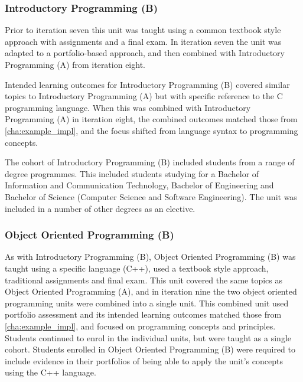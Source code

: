 
\subsubsection{Introductory Programming (B)} %
\label{ssub:introductory_programming_b}

Prior to iteration seven this unit was taught using a common textbook style approach with assignments and a final exam. In iteration seven the unit was adapted to a portfolio-based approach, and then combined with Introductory Programming (A) from iteration eight.

Intended learning outcomes for Introductory Programming (B) covered similar topics to Introductory Programming (A) but with specific reference to the C programming language. When this was combined with Introductory Programming (A) in iteration eight, the combined outcomes matched those from \cref{cha:example_impl}, and the focus shifted from language syntax to programming concepts.

The cohort of Introductory Programming (B) included students from a range of degree programmes. This included students studying for a Bachelor of Information and Communication Technology, Bachelor of Engineering and Bachelor of Science (Computer Science and Software Engineering). The unit was included in a number of other degrees as an elective.


\subsubsection{Object Oriented Programming (B)} %
\label{ssub:object_oriented_programming_b_}

As with Introductory Programming (B), Object Oriented Programming (B) was taught using a specific language (C++), used a textbook style approach, traditional assignments and final exam. This unit covered the same topics as Object Oriented Programming (A), and in iteration nine the two object oriented programming units were combined into a single unit. This combined unit used portfolio assessment and its intended learning outcomes matched those from \cref{cha:example_impl}, and focused on programming concepts and principles. Students continued to enrol in the individual units, but were taught as a single cohort. Students enrolled in Object Oriented Programming (B) were required to include evidence in their portfolios of being able to apply the unit's concepts using the C++ language.

